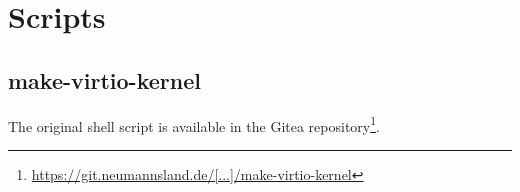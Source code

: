 \chapter{Scripts}
\label{app:scripts}

\section{make-virtio-kernel}



The original shell script is available in the Gitea repository\footnote{\href{https://git.neumannsland.de/casualscripter/Masterthesis/src/branch/master/home/lucifer/RPi/make-virtio-kernel}{https://git.neumannsland.de/[...]/make-virtio-kernel}}.